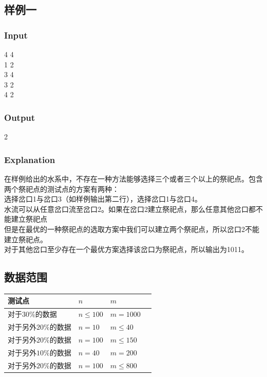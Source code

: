\documentclass{article}
\begin{document}
\begin{spacing}{1.0}
\subsection{样例一}
\subsubsection{Input}
4 4\\
1 2\\
3 4\\
3 2\\
4 2\\
\subsubsection{Output}
2
\subsubsection{Explanation}
在样例给出的水系中，不存在一种方法能够选择三个或者三个以上的祭祀点。包含两个祭祀点的测试点的方案有两种：\\
选择岔口1与岔口3（如样例输出第二行），选择岔口1与岔口4。\\
水流可以从任意岔口流至岔口2。如果在岔口2建立祭祀点，那么任意其他岔口都不能建立祭祀点\\
但是在最优的一种祭祀点的选取方案中我们可以建立两个祭祀点，所以岔口2不能建立祭祀点。\\
对于其他岔口至少存在一个最优方案选择该岔口为祭祀点，所以输出为1011。\\
\subsection{数据范围}

\begin{center}
\renewcommand{\arraystretch}{1.5}
\begin{table}[h]
\centering
\begin{tabular}{|p{5.5cm}<{\centering}|p{5.5cm}<{\centering}|p{3.2cm}<{\centering}|p{3.2cm}<{\centering}|}  
\hline
测试点  & $n$ & $m$   \\  
\hline
对于$30\%$的数据 & $n\leq 100$ & $m=1000$ \\
\hline
对于另外$20\%$的数据 & $n= 10$ & $m\leq 40$\\
\hline
对于另外$20\%$的数据& $n=100$ & $m\leq 150$\\
\hline
对于另外$10\%$的数据&$n=40$ &$m=200$ \\
\hline
对于另外$20\%$的数据 &$n=100$ &$m\leq 800$ \\
\hline
\end{tabular}
\end{table}
\end{center}

\end{spacing}
\end{document}

